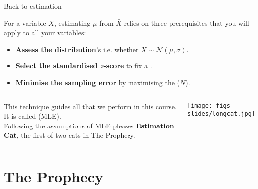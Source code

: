 \documentclass{beamer}
\begin{document}
	\begin{frame}[t]{Back to estimation}

	For a variable $X$, estimating $\mu$ from $\bar X$ relies on three prerequisites that you will apply to all your variables:

	\begin{itemize}
		\item \textbf{Assess the distribution}'s  i.e. whether $X \sim \mathcal{N}(\mu,\sigma)$.
		\item \textbf{Select the standardised $z$-score} to fix a .
		\item \textbf{Minimise the sampling error} by maximising the  ($N$).
	\end{itemize}
	
	\begin{columns}[T]
	

	This technique guides all  that we perform in this course. It is called  (MLE).\\[1em]
	
	Following the assumptions of MLE pleases \textbf{Estimation Cat}, the first of two cats in The Prophecy.
	\vspace{0em}
	\begin{flushright}
	\texttt{[image: figs-slides/longcat.jpg]}		
	\end{flushright}
		
	\end{columns}
		
	\end{frame}

	
	\section*{The Prophecy}
	
		
\end{document}
